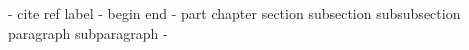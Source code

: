 -
cite ref label
-
begin end
-
part chapter section subsection subsubsection paragraph subparagraph
-
